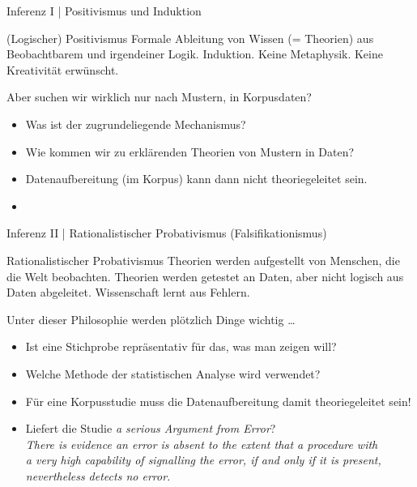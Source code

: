 \begin{frame}
  {Inferenz I | Positivismus und Induktion}
  \onslide<+->
  \onslide<+->
  \begin{block}
    {(Logischer) Positivismus}
    \alert{Formale} Ableitung von Wissen (= Theorien) aus Beobachtbarem und irgendeiner Logik. \alert{Induktion}. Keine Metaphysik. Keine Kreativität erwünscht.  
  \end{block}
  \Zeile
  \onslide<+->
  Aber suchen wir wirklich nur nach \alert{Mustern}, \zB in Korpusdaten?\\
    \Halbzeile
    \begin{itemize}[<+->]
      \item Was ist der \alert{zugrundeliegende Mechanismus}?
      \item Wie kommen wir zu \alert{erklärenden Theorien} von Mustern in Daten?
      \item \alert{Datenaufbereitung} (\zB im Korpus) kann dann nicht theoriegeleitet sein.
        \Halbzeile
      \item {}
    \end{itemize}
\end{frame}

\begin{frame}
  {Inferenz II | Rationalistischer Probativismus (Falsifikationismus)}
  \onslide<+->
  \onslide<+->
  \begin{block}
    {Rationalistischer Probativismus}
    Theorien werden aufgestellt von \alert{Menschen, die die Welt beobachten}. Theorien werden \alert{getestet an Daten}, aber nicht logisch aus Daten abgeleitet. Wissenschaft lernt aus Fehlern. 
  \end{block}
  \onslide<+->
  \Zeile
  Unter dieser Philosophie werden plötzlich Dinge wichtig \ldots
    \Halbzeile
    \begin{itemize}[<+->]
      \item Ist eine \alert{Stichprobe repräsentativ} für das, was man zeigen will?
      \item Welche \alert{Methode der statistischen Analyse} wird verwendet?
      \item Für eine Korpusstudie muss die Datenaufbereitung damit theoriegeleitet sein!
      \item Liefert die Studie \alert{\textit{a serious Argument from Error}}?\\
        \onslide<+->
        \Halbzeile
        {\small\textit{There is evidence an error is absent to the extent that a \alert{procedure with\\
        a very high capability of signalling the error}, if and only if it is present,\\
      nevertheless detects no error.} }\\
    \end{itemize}
\end{frame}



